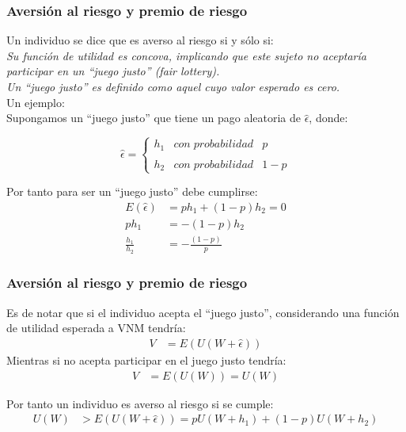 \begin{frame}
\frametitle{Aversión al riesgo y premio de riesgo}

Un individuo se dice que es averso al riesgo si y sólo si:
\\

\textit{Su función de utilidad es concova, implicando que este sujeto no aceptaría participar en un ``juego justo'' (fair lottery).\\
     Un ``juego justo'' es definido como aquel cuyo valor esperado es cero.}\\

Un ejemplo:\\
Supongamos un ``juego justo'' que tiene un pago aleatoria de $ \hat{\epsilon}$, donde:

\[
\hat{\epsilon}= \left\{ \begin{array}{lcl}
h_{1} & con\; probabilidad & p \\
& & \\
h_{2} & con\; probabilidad & 1-p
\end{array}
\right.
\] 

Por tanto para ser un ``juego justo'' debe cumplirse:
\begin{align}
E(\hat{\epsilon})&=ph_{1}+(1-p)h_{2}=0 \nonumber \\
ph_{1}&=-(1-p)h_{2} \nonumber \\
\frac{h_{1}}{h_{2}}&=-\frac{(1-p)}{p}\nonumber
\end{align}    
\end{frame}


\begin{frame}
    \frametitle{Aversión al riesgo y premio de riesgo}
  Es de notar que si el individuo acepta el ``juego justo'', considerando una función de utilidad esperada a VNM tendría:
\begin{align}
V&=E(U(W+\hat{\epsilon}))\nonumber 
\end{align}    
 Mientras si no acepta participar en el juego justo tendría:
 \begin{align}
 V&=E(U(W))=U(W)\nonumber 
 \end{align}     

Por tanto un individuo es averso al riesgo si se cumple:
\begin{align}
U(W)&> E(U(W+\hat{\epsilon}))=pU(W+h_{1})+(1-p)U(W+h_{2})\nonumber 
\end{align}  
  
\end{frame}


